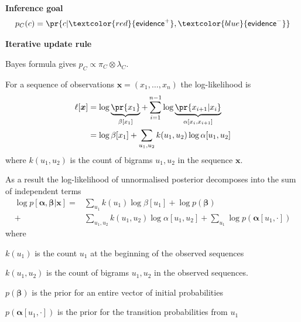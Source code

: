 \documentclass[landscape,footrule]{foils}
\renewcommand{\vec}[1]{\boldsymbol{#1}}
\newcommand{\EVPOS}{\textcolor{red}{\mathsf{evidence}^+}}
\newcommand{\EVNEG}{\textcolor{blue}{\mathsf{evidence}^-}}
\begin{document}

\vspace*{-0.0cm}
\textbf{Inference goal}
\begin{align*}
p_C(c)=\pr{c|\EVPOS,\EVNEG}
\end{align*}\vspace*{-1.5cm}


\textbf{Iterative update rule}
\begin{triangles}
\item Bayes formula gives $p_C\propto \pi_C\otimes\lambda_C$.
\end{triangles}






For a sequence of observations $\vec{x}=(x_1,\ldots, x_{n})$ the log-likelihood is
\begin{align*}
\ell[\vec{x}]&=\log \underbrace{\pr{x_1}}_{\beta[x_1]} + \sum_{i=1}^{n-1} \log \underbrace{\pr{x_{i+1}|x_{i}}}_{\alpha[x_i, x_{i+1}]} \\
&=\log \beta[x_1] + \sum_{u_1,u_2} k(u_1,u_2)\log\alpha[u_1,u_2]
\end{align*}
where $k(u_1,u_2)$ is the count of bigrams $u_1, u_2$ in the sequence $\vec{x}$.


\enlargethispage{0.5cm}
As a result the log-likelihood of unnormalised posterior decomposes into the sum of independent terms
\begin{align*}
\log p[\vec{\alpha},\vec{\beta}|\vec{x}]
=&\sum_{u_1} k(u_1)\log \beta[u_1] + \log p(\vec{\beta})\\
+&\sum_{u_1,u_2} k(u_1,u_2)\log\alpha[u_1,u_2]+\sum_{u_1}\log p(\vec{\alpha}[u_1,\cdot]) 
\end{align*}
where 
\begin{triangles}
\item $k(u_1)$ is the count $u_1$ at the beginning of the observed sequences
\item $k(u_1,u_2)$ is the count of bigrams $u_1, u_2$ in the observed sequences.
\item $p(\vec{\beta})$ is the prior for an entire vector of initial probabilities
\item $p(\vec{\alpha}[u_1,\cdot])$ is the prior for the transition probabilities from $u_1$ 
\end{triangles}
\end{document}
